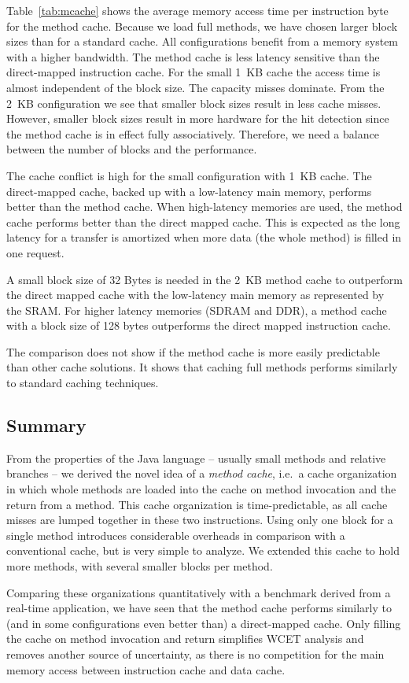 Table~\ref{tab:mcache} shows the average memory access time per
instruction byte for the method cache. Because we load full methods,
we have chosen larger block sizes than for a standard cache. All
configurations benefit from a memory system with a higher bandwidth.
The method cache is less latency sensitive than the direct-mapped
instruction cache. For the small 1~KB cache the access time is almost
independent of the block size. The capacity misses dominate. From the
2~KB configuration we see that smaller block sizes result in less
cache misses. However, smaller block sizes result in more hardware
for the hit detection since the method cache is in effect fully
associatively. Therefore, we need a balance between the number of
blocks and the performance.

The cache conflict is high for the small configuration with 1~KB
cache. The direct-mapped cache, backed up with a low-latency main
memory, performs better than the method cache. When high-latency
memories are used, the method cache performs better than the direct
mapped cache. This is expected as the long latency for a transfer is
amortized when more data (the whole method) is filled in one request.

A small block size of 32 Bytes is needed in the 2~KB method cache to
outperform the direct mapped cache with the low-latency main memory
as represented by the SRAM. For higher latency memories (SDRAM and
DDR), a method cache with a block size of 128 bytes outperforms the
direct mapped instruction cache.

The comparison does not show if the method cache is more easily
predictable than other cache solutions. It shows that caching full
methods performs similarly to standard caching techniques.



\subsection{Summary}

From the properties of the Java language -- usually small methods and
relative branches -- we derived the novel idea of a \emph{method
cache}, i.e.\ a cache organization in which whole methods are loaded
into the cache on method invocation and the return from a method.
This cache organization is time-predictable, as all cache misses are
lumped together in these two instructions. Using only one block for a
single method introduces considerable overheads in comparison with a
conventional cache, but is very simple to analyze. We extended this
cache to hold more methods, with several smaller blocks per method.

Comparing these organizations quantitatively with a benchmark derived
from a real-time application, we have seen that the method cache
performs similarly to (and in some configurations even better than) a
direct-mapped cache. Only filling the cache on method invocation and
return simplifies WCET analysis and removes another source of
uncertainty, as there is no competition for the main memory access
between instruction cache and data cache.
